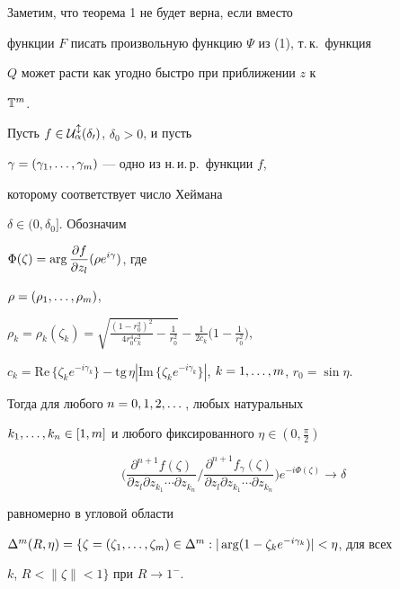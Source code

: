 Заметим, что теорема 1 не будет верна, если вместо


функции $F$ писать произвольную функцию $\Psi$ из (1), т.\,к.~функция


$Q$ может расти как угодно быстро при приближении $z$ к


$\Bbb T^m$.





\begin{thm}


Пусть $f\in \cal U^l_\alpha(\delta_0)$, $\delta_0>0$, и пусть


$\gamma=(\gamma_1,\dotsc,\gamma_m)$ --- одно из н.\,и.\,р.~функции $f$,


которому соответствует число Хеймана


$\delta\in(0,\delta_0]$. Обозначим


$\Phi(\zeta)=\arg\displaystyle\frac{\partial f}{\partial z_l}(\rho e^{i\gamma})$, где


$\rho=(\rho_1,\dotsc,\rho_m)$,


$\rho_k=\rho_k(\zeta_k)=


\displaystyle \sqrt{\frac{(1-r_0^2)^2}


{4r_0^4c^2_k}-\frac1{r_0^2}}


-\frac 1{2c_k}\Big(1-\frac 1{r_0^2}\Big)$,


$c_k={\mathrm{Re}\,}\{\zeta_ke^{-i\gamma_k}\}-{\mathrm{tg}\,}


\eta |{\mathrm{Im}\,}\{\zeta_k


e^{-i\gamma_k}\}|$, $k=1,\cd,m$, $r_0=\sin\eta$.


Тогда для любого $n=0,1,2,\dotsc$, любых натуральных


$k_1,\dotsc,k_n\in [1,m]$ и любого фиксированного $\eta\in (0,\frac{\pi}2)$


$$


\bigg(\frac{\partial^{n+1}f(\zeta)}{\partial z_l\partial


z_{k_1}\dotsb\partial z_{k_n}}\bigg/


\frac{\partial^{n+1}f_\gamma(\zeta)}


{\partial z_l\partial


z_{k_1}\dotsb\partial z_{k_n}}\bigg)e^{-i\Phi(\zeta)}\to\delta


$$


равномерно в угловой области


$\Delta^m(R,\eta)=\{\zeta=(\zeta_1,\cd,\zeta_m)\in\Delta^m: |\arg


(1-\zeta_ke^{-i\gamma_k})|<\eta$, для всех


$k$, $R<\|\zeta\|<1\}$ при $R\to 1^-$.


\end{thm}





